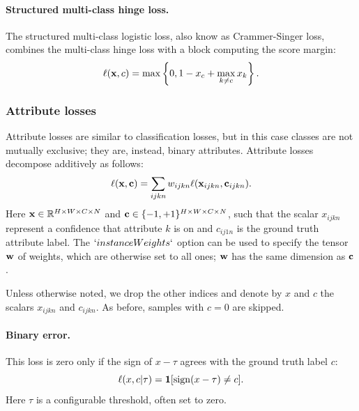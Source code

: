 \paragraph{Structured multi-class hinge loss.} The structured multi-class logistic loss, also know as Crammer-Singer loss, combines the multi-class hinge loss with a block computing the score margin:
\begin{equation}\label{e:loss-structuredmulticlasshinge}
\ell(\mathbf{x}, c) = \max\left\{0, 1 - x_c + \max_{k \not= c} x_k\right\}.
\end{equation}

\subsubsection{Attribute losses}\label{s:loss-attributes}

Attribute losses are similar to classification losses, but in this case classes are not mutually exclusive; they are, instead, binary attributes. Attribute losses decompose additively as follows:
\begin{equation}\label{e:addlossattribute}
\ell(\mathbf{x},\mathbf{c}) = \sum_{ijkn} w_{ijkn} \ell(\mathbf{x}_{ijkn}, \mathbf{c}_{ijkn}).
\end{equation}
Here $\mathbf{x}\in \mathbb{R}^{H \times W \times C \times N}$ and $\mathbf{c} \in \{-1,+1\}^{H \times W \times C \times N}$, such that the scalar $x_{ijkn}$ represent a confidence that attribute $k$ is on and $c_{ij1n}$ is the ground truth attribute label. The $`instanceWeights`$ option can be used to specify the tensor $\mathbf{w}$ of weights, which are otherwise set to all ones; $\mathbf{w}$ has the same dimension as $\mathbf{c}$.

Unless otherwise noted, we drop the other indices and denote by $x$ and $c$  the scalars $x_{ijkn}$ and  $c_{ijkn}$. As before, samples with $c=0$ are skipped.

\paragraph{Binary error.} This loss is zero only if the sign of $x - \tau$ agrees with the ground truth label $c$:
\begin{equation}\label{e:loss-binary}
\ell(x,c|\tau) = \mathbf{1}[\sign(x-\tau) \not= c].
\end{equation}
Here $\tau$ is a configurable threshold, often set to zero.

